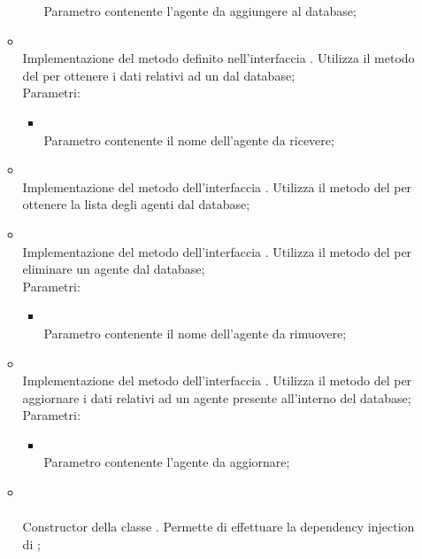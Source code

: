 \begin{itemize}
\begin{itemize}
\begin{itemize}
			Parametro contenente l'agente da aggiungere al database;
		\end{itemize}
		\item[]  \\		Implementazione del metodo definito nell'interfaccia . Utilizza il metodo  del  per ottenere i dati relativi ad un  dal database;\\
		Parametri:
		\begin{itemize}
			\item {} \\
			Parametro contenente il nome dell'agente da ricevere;
		\end{itemize}
		\item[]  \\		Implementazione del metodo dell'interfaccia . Utilizza il metodo  del  per ottenere la lista degli agenti dal database;\\
		\item[]  \\		Implementazione del metodo dell'interfaccia . Utilizza il metodo  del  per eliminare un agente dal database;\\
		Parametri:
		\begin{itemize}
			\item {} \\
			Parametro contenente il nome dell'agente da rimuovere;
		\end{itemize}
		\item[]  \\		Implementazione del metodo dell'interfaccia . Utilizza il metodo  del  per aggiornare i dati relativi ad un agente presente all'interno del database;\\
		Parametri:
		\begin{itemize}
			\item {} \\
			Parametro contenente l'agente da aggiornare;
		\end{itemize}
		\item[] \\ \\		Constructor della classe . Permette di effettuare la dependency injection di ;\\

\end{itemize}
\end{itemize}
